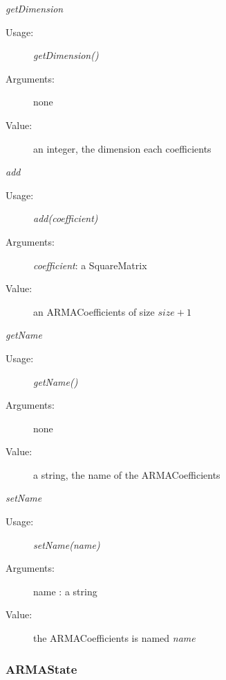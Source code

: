 \begin{description}
\begin{description}
\item \textit{getDimension}
\begin{description}
\item[Usage:] \textit{getDimension()}
\item[Arguments:] none
\item[Value:]   an integer, the dimension each coefficients
\end{description}
\bigskip

\item \textit{add}
\begin{description}
\item[Usage:] \textit{add(coefficient)}
\item[Arguments:] \textit{coefficient}: a SquareMatrix
\item[Value:]    an ARMACoefficients of size  $size +1$
\end{description}
\bigskip

\item \textit{getName}
\begin{description}
\item[Usage:] \textit{getName()}
\item[Arguments:] none
\item[Value:] a string, the name of the ARMACoefficients
\end{description}
\bigskip

\item \textit{setName}
\begin{description}
\item[Usage:] \textit{setName(name)}
\item[Arguments:] name : a string
\item[Value:] the ARMACoefficients is named \textit{name}
\end{description}
\bigskip


\end{description}

\end{description}



\newpage
\subsubsection{ARMAState}


